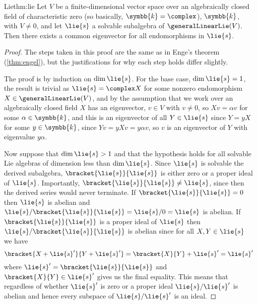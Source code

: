 \documentclass[fleqn]{NotesClass}
\renewcommand{\field}{\symbb{k}}
\begin{document}
    \begin{thm}{Lie}{thm:lie}
        Let \(V\) be a finite-dimensional vector space over an algebraically closed field of characteristic zero (so basically, \(\field = \complex\)), \(\field\), with \(V \ne 0\), and let \(\lie{s}\) a solvable subalgebra of \(\generalLinearLie(V)\).
        Then there exists a common eigenvector for all endomorphisms in \(\lie{s}\).
        \begin{proof}
            The steps taken in this proof are the same as in Enge's theorem (\cref{thm:engel}), but the justifications for why each step holds differ slightly.
            
            The proof is by induction on \(\dim \lie{s}\).
            For the base case, \(\dim \lie{s} = 1\), the result is trivial as \(\lie{s} = \complex X\) for some nonzero endomorphism \(X \in \generalLinearLie(V)\), and by the assumption that we work over an algebraically closed field \(X\) has an eigenvector, \(v \in V\) with \(v \ne 0\), so \(Xv = \alpha v\) for some \(\alpha \in \field\), and this is an eigenvector of all \(Y \in \lie{s}\) since \(Y = yX\) for some \(y \in \field\), since \(Yv = yXv = y\alpha v\), so \(v\) is an eigenvector of \(Y\) with eigenvalue \(y\alpha\).
            
            Now suppose that \(\dim\lie{s} > 1\) and that the hypothesis holds for all solvable Lie algebras of dimension less than \(\dim \lie{s}\).
            Since \(\lie{s}\) is solvable the derived subalgebra, \(\bracket{\lie{s}}{\lie{s}}\) is either zero or a proper ideal of \(\lie{s}\).
            Importantly, \(\bracket{\lie{s}}{\lie{s}} \ne \lie{s}\), since then the derived series would never terminate.
            If \(\bracket{\lie{s}}{\lie{s}} = 0\) then \(\lie{s}\) is abelian and \(\lie{s}/\bracket{\lie{s}}{\lie{s}} = \lie{s} / 0 = \lie{s}\) is abelian.
            If \(\bracket{\lie{s}}{\lie{s}}\) is a proper ideal of \(\lie{s}\) then \(\lie{s}/\bracket{\lie{s}}{\lie{s}}\) is abelian since for all \(X, Y \in \lie{s}\) we have
            \begin{equation}
                \bracket{X + \lie{s}'}{Y + \lie{s}'} = \bracket{X}{Y} + \lie{s}' = \lie{s}'
            \end{equation}
            where \(\lie{s}' = \bracket{\lie{s}}{\lie{s}}\) and \(\bracket{X}{Y} \in \lie{s}'\) gives us the final equality.
            This means that regardless of whether \(\lie{s}'\) is zero or a proper ideal \(\lie{s}/\lie{s}'\) is abelian and hence every subspace of \(\lie{s}/\lie{s}'\) is an ideal.
            

\end{proof}
\end{thm}
\end{document}
